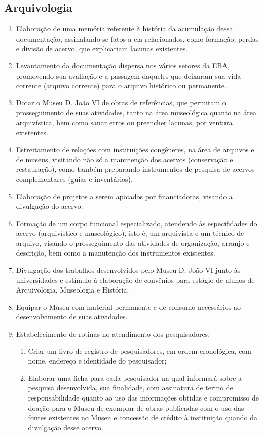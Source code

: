 \subsection{Arquivologia}

\begin{enumerate}
	\item Elaboração de uma memória referente à história da acumulação dessa documentação, assinalando-se fatos a ela relacionados, como formação, perdas e divisão de acervo, que explicariam lacunas existentes.
	\item Levantamento da documentação dispersa nos vários setores da EBA, promovendo sua avaliação e a passagem daqueles que deixaram sua vida corrente (arquivo corrente) para o arquivo histórico ou permanente.
	\item Dotar o Museu D. João VI de obras de referências, que permitam o prosseguimento de suas atividades, tanto na área museológica quanto na área arquivística, bem como sanar erros ou preencher lacunas, por ventura existentes.
	\item Estreitamento de relações com instituições congêneres, na área de arquivos e de museus, visitando não só a manutenção dos acervos (conservação e restauração), como também preparando instrumentos de pesquisa de acervos complementares (guias e inventários).
	\item Elaboração de projetos a serem apoiados por financiadoras, visando a divulgação do acervo.
	\item Formação de um corpo funcional especializado, atendendo às especifidades do acervo (arquivístico e museológico), isto é, um arquivista e um técnico de arquivo, visando o prosseguimento das atividades de organização, arranjo e descrição, bem como a manutenção dos instrumentos existentes.
	\item Divulgação dos trabalhos desenvolvidos pelo Museu D. João VI junto às universidades e estímulo à elaboração de convênios para estágio de alunos de Arquivologia, Museologia e História.
	\item Equipar o Museu com material permanente e de consumo necessários ao desenvolvimento de suas atividades.
	\item Estabelecimento de rotinas no atendimento dos pesquisadores:
		\begin{enumerate}
			\item Criar um livro de registro de pesquisadores, em ordem cronológica, com nome, endereço e identidade do pesquisador;
			\item Elaborar uma ficha para cada pesquisador na qual informará sobre a pesquisa desenvolvida, sua finalidade, com assinatura de termo de responsabilidade quanto ao uso das informações obtidas e compromisso de doação para o Museu de exemplar de obras publicadas com o uso das fontes existentes no Museu e concessão de crédito à instituição quando da divulgação desse acervo.

\end{enumerate}
\end{enumerate}
